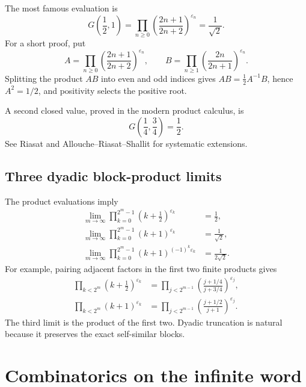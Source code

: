 \documentclass[11pt,oneside]{article}
\numberwithin{equation}{section}
\theoremstyle{definition}
\theoremstyle{remark}
\newcommand{\eps}{\varepsilon}
\begin{document}
The most famous evaluation is
\begin{equation}
 \boxed{G\left(\frac12,1\right)=
 \prod_{n\ge0}\left(\frac{2n+1}{2n+2}\right)^{\eps_n}
 =\frac1{\sqrt2}.}
 \label{eq:Woods-Robbins}
\end{equation}
For a short proof, put
\[
 A=\prod_{n\ge0}\left(\frac{2n+1}{2n+2}\right)^{\eps_n},
 \qquad
 B=\prod_{n\ge1}\left(\frac{2n}{2n+1}\right)^{\eps_n}.
\]
Splitting the product \(AB\) into even and odd indices gives
\(AB=\tfrac12A^{-1}B\), hence \(A^2=1/2\), and positivity selects the
positive root.

A second closed value, proved in the modern product calculus, is
\begin{equation}
 \boxed{G\left(\frac14,\frac34\right)=\frac12.}
 \label{eq:quarter-product}
\end{equation}
See Riasat \cite{RiasatProducts} and Allouche--Riasat--Shallit
\cite{AlloucheRiasatShallit} for systematic extensions.

\subsection{Three dyadic block-product limits}

The product evaluations imply
\begin{align}
 \lim_{m\to\infty}\prod_{k=0}^{2^m-1}
 \left(k+\frac12\right)^{\eps_k}&=\frac12,
 \label{eq:block-product-half}\\
 \lim_{m\to\infty}\prod_{k=0}^{2^m-1}(k+1)^{\eps_k}
 &=\frac1{\sqrt2},
 \label{eq:block-product-one}\\
 \lim_{m\to\infty}\prod_{k=0}^{2^m-1}
 (k+1)^{(-1)^k\eps_k}&=\frac1{2\sqrt2}.
 \label{eq:block-product-alternating}
\end{align}
For example, pairing adjacent factors in the first two finite products gives
\begin{align*}
 \prod_{k<2^m}\left(k+\frac12\right)^{\eps_k}
 &=\prod_{j<2^{m-1}}
 \left(\frac{j+1/4}{j+3/4}\right)^{\eps_j},\\
 \prod_{k<2^m}(k+1)^{\eps_k}
 &=\prod_{j<2^{m-1}}
 \left(\frac{j+1/2}{j+1}\right)^{\eps_j}.
\end{align*}
The third limit is the product of the first two.  Dyadic truncation is natural
because it preserves the exact self-similar blocks.

\section{Combinatorics on the infinite word}
\label{sec:words}
\end{document}
